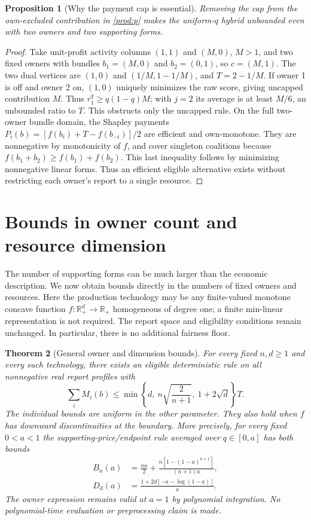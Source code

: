 \documentclass[11pt]{article}
\newtheorem{theorem}{Theorem}[section]
\newtheorem{proposition}[theorem]{Proposition}
\theoremstyle{definition}\newtheorem{definition}[theorem]{Definition}
\theoremstyle{remark}\newtheorem{remark}[theorem]{Remark}
\newcommand{\R}{\mathbb R}
\begin{document}
\begin{proposition}[Why the payment cap is essential]\label{prod:uncapped}
Removing the cap from the own-excluded contribution in
\eqref{prod:p} makes the uniform-$q$ hybrid unbounded even with two owners
and two supporting forms.
\end{proposition}
\begin{proof}
Take unit-profit activity columns $(1,1)$ and $(M,0)$, $M>1$, and two
fixed owners with bundles $b_1=(M,0)$ and $b_2=(0,1)$, so $c=(M,1)$. The two dual vertices are $(1,0)$ and $(1/M,1-1/M)$, and
$T=2-1/M$. If owner 1 is off and owner 2 on, $(1,0)$ uniquely minimizes the
raw score, giving uncapped contribution $M$. Thus $r_1^q\ge q(1-q)M$;
with $j=2$ its average is at least $M/6$, an unbounded ratio to $T$.
This obstructs only the uncapped rule. On the full two-owner bundle
domain, the Shapley payments
$P_i(b)=[f(b_i)+T-f(b_{-i})]/2$ are efficient and own-monotone.
They are nonnegative by monotonicity of $f$, and cover singleton coalitions
because $f(b_1+b_2)\ge f(b_1)+f(b_2)$. This last inequality follows by
minimizing nonnegative linear forms. Thus an efficient eligible alternative
exists without restricting each owner's report to a single resource.
\end{proof}

\section{Bounds in owner count and resource dimension}\label{general:section}
The number of supporting forms can be much larger than the economic description.
We now obtain bounds directly in the numbers of fixed owners and resources.
Here the production technology may be any finite-valued monotone concave
function $f:\R_+^d\to\R_+$ homogeneous of degree one; a finite min-linear
representation is not required. The report space and eligibility conditions
remain unchanged. In particular, there is no additional fairness floor.

\begin{theorem}[General owner and dimension bounds]\label{general:sqrt}
For every fixed $n,d\ge1$ and every such technology, there exists an eligible
deterministic rule on all nonnegative real report profiles with
\begin{equation}\label{general:combined}
 \sum_i M_i(b)\le
 \min\left\{d,\ n\sqrt{\frac{2}{n+1}},\ 1+2\sqrt d\right\}T.
\end{equation}
The individual bounds are uniform in the other parameter. They also hold when
$f$ has downward discontinuities at the boundary. More precisely, for every
fixed $0<a<1$ the supporting-price/endpoint rule averaged over $q\in[0,a]$
has both bounds
\begin{align}
 B_n(a)&=\frac{na}{2}+
 \frac{n[1-(1-a)^{n+1}]}{(n+1)a},\label{general:owner}\\
 D_d(a)&=\frac{1+2d[-a-\log(1-a)]}{a}.\label{general:dimension}
\end{align}
The owner expression remains valid at $a=1$ by polynomial integration.
No polynomial-time evaluation or preprocessing claim is made.
\end{theorem}
\end{document}
